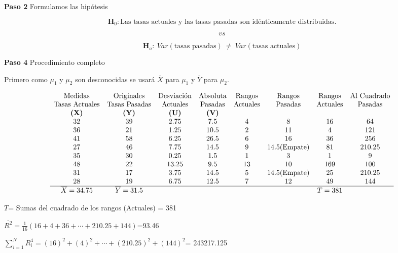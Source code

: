 \documentclass[
  a4paper,
  oneside,
  openany]{book}
\begin{document}
\textbf{Paso 2} Formulamos las hipótesis

\[\textbf{H}_0: \mbox{Las tasas actuales y las tasas pasadas son idénticamente distribuidas.}\]

\[vs\]

\[\textbf{H}_a: \ Var(\mbox{tasas pasadas}) \ \neq  \ Var(\mbox{tasas actuales})\]

\textbf{Paso 4} Procedimiento completo

Primero como \(\mu_{1}\) y \(\mu_{2}\) son desconocidas se usará \(\overline{X}\) para \(\mu_{1}\) y \(\overline{Y}\) para \(\mu_{2}\).

\[
\begin{array}{c c c c c c c c }
\mbox{Medidas} & \mbox{Originales} & \mbox{Desviación} & \mbox{Absoluta} & \mbox{Rangos} & \mbox{Rangos} & \mbox{Rangos} & \mbox{Al Cuadrado} \\
\mbox{Tasas Actuales} & \mbox{Tasas Pasadas} & \mbox{Actuales} & \mbox{Pasadas} & \mbox{Actuales} & \mbox{Pasadas}& \mbox{Actuales} & \mbox{Pasadas} \\
\textbf{(X)} & \textbf{(Y)} & \textbf{(U)}   & \textbf{(V)}  &     &               &     &         \\
32  & 39  & 2.75  & 7.5  &  4  &  8            & 16  &  64         \\
36  & 21  & 1.25  & 10.5 &  2  &  11           &  4  &  121    \\
41  & 58  & 6.25  & 26.5 &  6 &   16           & 36  &  256       \\
27  & 46  & 7.75  & 14.5 &  9  &  14.5(\mbox{Empate})& 81  &  210.25       \\
35  & 30  & 0.25  & 1.5  &  1  &  3            & 1   &  9     \\
48  & 22  & 13.25 & 9.5  &  13 &  10           & 169 &  100    \\
31  & 17  & 3.75  & 14.5 &  5  &  14.5(\mbox{Empate})& 25  &  210.25     \\
28  & 19  & 6.75  & 12.5 &  7  &  12           & 49  &  144   \\
\hline
\overline{X}= 34.75 & \overline{Y}= 31.5 & & & & & T=381
\end{array}
\]

\(T\)= Sumas del cuadrado de los rangos (Actuales) = 381

\(\overline{R^2}= \frac{1}{16}\left(16+4+36+\cdots+210.25+144\right)\)=93.46

\(\sum_{i=1}^{N}R_{i}^4= (16)^2+(4)^2+\cdots+(210.25)^2+(144)^2\)= 243217.125
\end{document}
